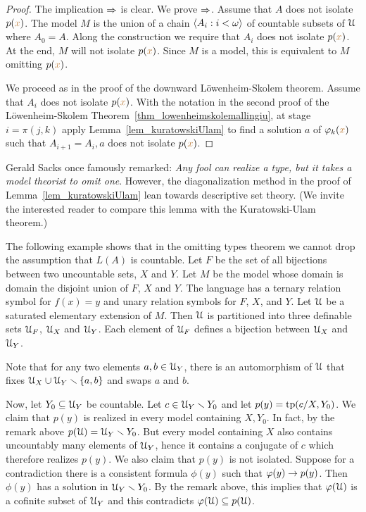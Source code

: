 \begin{proof}
The implication $\Rightarrow$ is clear. 
We prove $\Rightarrow$.
Assume that $A$ does not isolate $p({\color{brown} x})$.
The model $M$ is the union of a chain $\langle A_i:i<\omega\rangle$ of countable subsets of $\EuScript U$ where $A_0=A$.
Along the construction we require that $A_i$ does not isolate $p({\color{brown} x})$.
At the end, $M$ will not isolate $p({\color{brown} x})$.
Since $M$ is a model, this is equivalent to $M$ omitting $p({\color{brown} x})$.

We proceed as in the proof of the downward L\"owenheim-Skolem theorem.
Assume that $A_i$ does not isolate $p({\color{brown} x})$.
With the notation in the second proof of the L\"owenheim-Skolem Theorem~\ref{thm_lowenheimskolemallingiu}, at stage $i=\pi(j,k)$ apply Lemma~\ref{lem_kuratowskiUlam} to find a solution $a$ of $\varphi_k({\color{brown} x})$ such that $A_{i+1}=A_i,a$ does not isolate $p({\color{brown} x})$.
\end{proof}

Gerald Sacks once famously remarked: \textit{Any fool can realize a type, but it takes a model theorist to omit one}.
However, the diagonalization method in the proof of Lemma~\ref{lem_kuratowskiUlam} lean towards descriptive set theory.
(We invite the interested reader to compare this lemma with the Kura\-towski-Ulam theorem.)

\begin{example}\label{ex_AK}
The following example shows that in the omitting types theorem we cannot drop the assumption that $L(A)$ is countable.
Let $F$ be the set of all bijections between two uncountable sets, $X$ and $Y$.
Let $M$ be the model whose domain is domain the disjoint union of $F$, $X$ and $Y$.
The language has a ternary relation symbol for $f(x)=y$ and unary relation symbols for $F$, $X$, and $Y$.
Let $\EuScript U$ be a saturated elementary extension of $M$.
Then $\EuScript U$ is partitioned into three definable sets $\EuScript U_F$, $\EuScript U_X$ and $\EuScript U_Y$.
Each element of $\EuScript U_F$ defines a bijection between $\EuScript U_X$ and $\EuScript U_Y$.

Note that for any two elements $a,b\in\EuScript U_Y$, there is an automorphism of $\EuScript U$ that fixes $\EuScript U_X\cup\EuScript U_Y\smallsetminus\{a,b\}$ and swaps $a$ and $b$.

Now, let $Y_0\subseteq\EuScript U_Y$ be countable.
Let $c\in\EuScript U_Y\smallsetminus Y_0$ and let $p(y)={\rm tp}(c/X,Y_0)$.
We claim that $p(y)$ is realized in every model containing $X,Y_0$.
In fact, by the remark above $p(\EuScript U)=\EuScript U_Y\smallsetminus Y_0$.
But every model containing $X$ also contains uncountably many elements of $\EuScript U_Y$, hence it contains a conjugate of $c$ which therefore realizes $p(y)$.
We also claim that $p(y)$ is not isolated.
Suppose for a contradiction there is a consistent formula $\phi(y)$ such that $\varphi(y)\rightarrow p(y)$.
Then $\phi(y)$ has a solution in $\EuScript U_Y\smallsetminus Y_0$.
By the remark above, this implies that $\varphi(\EuScript U)$ is a cofinite subset of $\EuScript U_Y$ and this contradicts $\varphi(\EuScript U)\subseteq p(\EuScript U)$.
\end{example}

